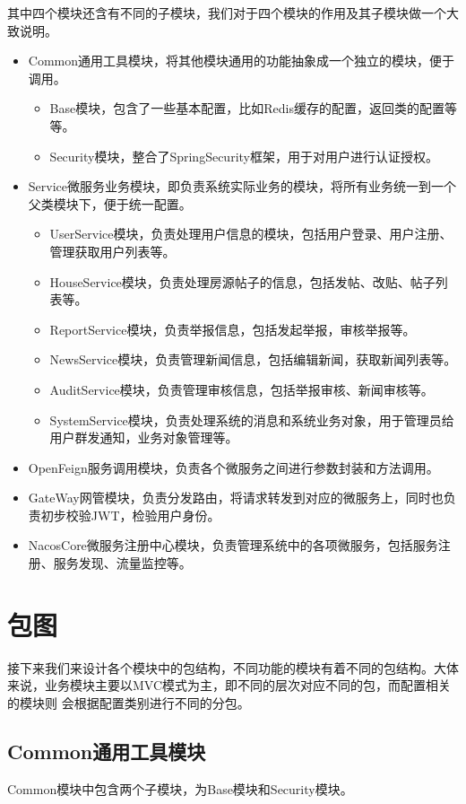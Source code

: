 其中四个模块还含有不同的子模块，我们对于四个模块的作用及其子模块做一个大致说明。
\begin{itemize}
    \item Common通用工具模块，将其他模块通用的功能抽象成一个独立的模块，便于调用。
    \begin{itemize}
        \item Base模块，包含了一些基本配置，比如Redis缓存的配置，返回类的配置等等。
        \item Security模块，整合了SpringSecurity框架，用于对用户进行认证授权。
    \end{itemize}
    \item Service微服务业务模块，即负责系统实际业务的模块，将所有业务统一到一个父类模块下，便于统一配置。
    \begin{itemize}
        \item UserService模块，负责处理用户信息的模块，包括用户登录、用户注册、管理获取用户列表等。
        \item HouseService模块，负责处理房源帖子的信息，包括发帖、改贴、帖子列表等。
        \item ReportService模块，负责举报信息，包括发起举报，审核举报等。
        \item NewsService模块，负责管理新闻信息，包括编辑新闻，获取新闻列表等。
        \item AuditService模块，负责管理审核信息，包括举报审核、新闻审核等。
        \item SystemService模块，负责处理系统的消息和系统业务对象，用于管理员给用户群发通知，业务对象管理等。
    \end{itemize}
    \item OpenFeign服务调用模块，负责各个微服务之间进行参数封装和方法调用。
    \item GateWay网管模块，负责分发路由，将请求转发到对应的微服务上，同时也负责初步校验JWT，检验用户身份。
    \item NacosCore微服务注册中心模块，负责管理系统中的各项微服务，包括服务注册、服务发现、流量监控等。
\end{itemize}

\section{包图}
接下来我们来设计各个模块中的包结构，不同功能的模块有着不同的包结构。大体来说，业务模块主要以MVC模式为主，即不同的层次对应不同的包，而配置相关的模块则
会根据配置类别进行不同的分包。

\subsection{Common通用工具模块}
Common模块中包含两个子模块，为Base模块和Security模块。
